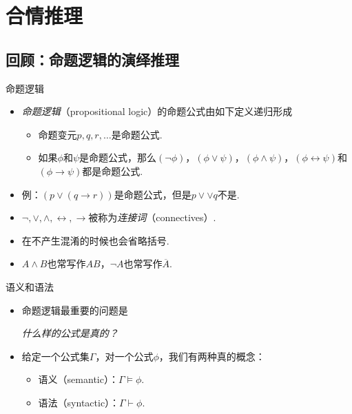 \chapter{合情推理}\label{chap:plausible-reasoning}


\section{回顾：命题逻辑的演绎推理}
\begin{frame}{命题逻辑}
\begin{itemize}
    \item \emph{命题逻辑}（propositional logic）的命题公式由如下定义递归形成
    \begin{itemize}
        \item 命题变元$p,q,r,\dots$是命题公式.
        \item 如果$\phi$和$\psi$是命题公式，那么$(\neg\phi)$，$(\phi\vee\psi)$，$(\phi\wedge\psi)$，$(\phi\leftrightarrow\psi)$和$(\phi\to\psi)$都是命题公式.
    \end{itemize}
    \item 例：$(p\vee(q\to r))$是命题公式，但是$p\vee\vee q$不是.
    \item $\neg,\vee,\wedge,\leftrightarrow,\to$被称为\emph{连接词}（connectives）.
    \item 在不产生混淆的时候也会省略括号.
    \item $A\wedge B$也常写作$AB$，$\neg A$也常写作$\overline{A}$.
\end{itemize}
\end{frame}

\begin{frame}{语义和语法}
\begin{itemize}
    \item 命题逻辑最重要的问题是
    
    \begin{center}
    \itshape
        什么样的公式是真的？    
    \end{center}
    
    \item 给定一个公式集$\Gamma$，对一个公式$\phi$，我们有两种真的概念：
    \begin{itemize}
        \item 语义（semantic）：$\Gamma\models \phi$.
        \item 语法（syntactic）：$\Gamma\vdash \phi$.
    \end{itemize}
\end{itemize}
\end{frame}

